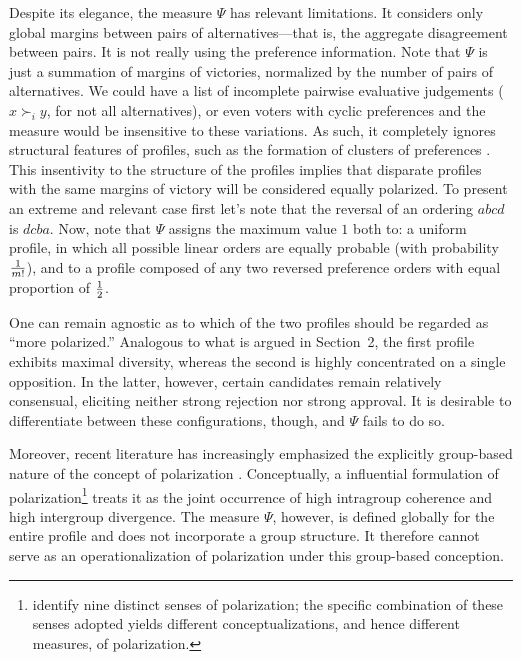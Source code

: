 \documentclass[12pt]{article}
\begin{document}
Despite its elegance, the measure \(\Psi\) has relevant limitations. It considers
only global margins between pairs of alternatives—that is, the aggregate
disagreement between pairs. It is not really using the preference information. Note that \(\Psi\) is just a summation of margins of victories, normalized by  the number of pairs of alternatives. We could have a list of incomplete pairwise evaluative judgements (\(x\succ_{i}y\), for not all alternatives), or even voters with cyclic preferences  and the measure would be insensitive to these variations. As such, it  completely ignores structural features of
profiles, such as the formation of clusters of preferences
\parencite{bramson16_disam_social_polar_concep_measur}. This insentivity to the structure of the profiles implies that disparate profiles with the same margins of victory will be considered equally polarized. To present an extreme and relevant case first let's note that the reversal of an ordering \( abcd \) is \( dcba \). Now,
note that \(\Psi\) assigns the maximum value \(1\) both to: a uniform profile, in
which all possible linear orders are equally probable (with probability \(1 \over {m!}\)), and to a profile
composed of any two reversed preference orders with equal proportion of \(1 \over 2\).



One can remain agnostic as to which of the two profiles should be regarded as
``more polarized.'' Analogous to what is argued in Section~2, the first profile
exhibits maximal diversity, whereas the second is highly concentrated on a
single opposition. In the latter, however, certain candidates remain
relatively consensual, eliciting neither strong rejection nor strong approval.
It is  desirable to differentiate between these configurations, though, and
\(\Psi\) fails to do so.

Moreover, recent literature has increasingly emphasized the explicitly
group-based nature of the concept of polarization
\parencite{mehlhaff23_group_based_approac_to_measur_polar,
  bramson2017understanding}. Conceptually, a influential formulation of
polarization\footnote{\textcite{bramson2017understanding, bramson16_disam_social_polar_concep_measur}
identify nine distinct senses of polarization; the specific combination of
these senses adopted yields different conceptualizations, and hence different
measures, of polarization.} treats it as the joint occurrence of high
intragroup coherence and high intergroup divergence. The measure \(\Psi\),
however, is defined globally for the entire profile and does not incorporate a
group structure. It therefore cannot serve as an operationalization of
polarization under this group-based conception.
\end{document}
